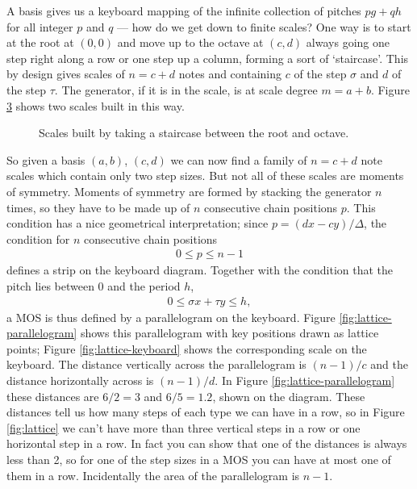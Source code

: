 \documentclass[a4paper,11pt]{article}
\begin{document}
A basis gives us a keyboard mapping of the infinite collection of pitches $p g
+ q h$ for all integer $p$ and $q$ --- how do we get down to finite scales?
One way is to start at the root at $(0, 0)$ and move up to the octave at $(c,
d)$ always going one step right along a row or one step up a column, forming a
sort of `staircase'. This by design gives scales of $n = c + d$ notes and
containing $c$ of the step $\sigma$ and $d$ of the step $\tau$. The generator,
if it is in the scale, is at scale degree $m = a + b$. Figure
\ref{fig:staircase} shows two scales built in this way.

\begin{figure}
\begin{subfigure}{0.5 \textwidth}

\caption{}
\label{fig:staircase-mos}
\end{subfigure}\hspace{0.05 \textwidth}
\begin{subfigure}{0.5 \textwidth}

\caption{}
\label{fig:staircase-notmos}
\end{subfigure}
\caption{Scales built by taking a staircase between the root and octave.}
\label{fig:staircase}
\end{figure}

So given a basis $(a, b)$, $(c, d)$ we can now find a family of $n = c + d$
note scales which contain only two step sizes. But not all of these scales are
moments of symmetry. Moments of symmetry are formed by stacking the generator
$n$ times, so they have to be made up of $n$ consecutive chain positions $p$.
This condition has a nice geometrical interpretation; since $p = (d x - c
y)/\Delta$, the condition for $n$ consecutive chain positions
\begin{align}
    0 \leq p \leq n-1
\end{align}
defines a strip on the keyboard diagram. Together with the condition that the
pitch lies between 0 and the period $h$,
\begin{align}
    0 \leq \sigma x + \tau y \leq h,
\end{align}
a MOS is thus defined by a parallelogram on the keyboard. Figure
\ref{fig:lattice-parallelogram} shows this parallelogram with key positions
drawn as lattice points; Figure \ref{fig:lattice-keyboard} shows the
corresponding scale on the keyboard. The distance vertically across the
parallelogram is $(n - 1)/c$ and the distance horizontally across is $(n -
1)/d$. In Figure \ref{fig:lattice-parallelogram} these distances are $6/2 = 3$
and $6/5 = 1.2$, shown on the diagram. These distances tell us how many steps
of each type we can have in a row, so in Figure \ref{fig:lattice} we can't have
more than three vertical steps in a row or one horizontal step in a row. In
fact you can show that one of the distances is always less than 2, so for one
of the step sizes in a MOS you can have at most one of them in a row.
Incidentally the area of the parallelogram is $n - 1$.
\end{document}
